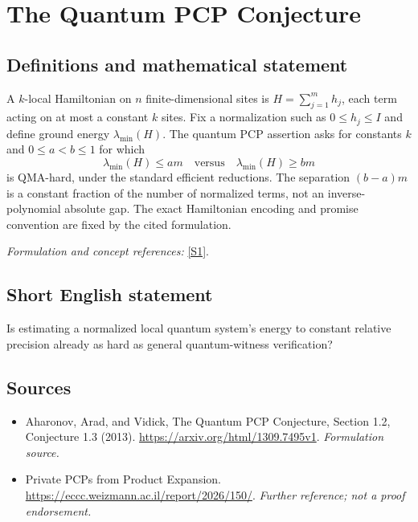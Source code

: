 \documentclass[11pt]{article}
\begin{document}
\section*{\texorpdfstring{The Quantum PCP Conjecture}{The Quantum PCP Conjecture}}\label{41}
\subsection{Definitions and mathematical statement}
A $k$-local Hamiltonian on $n$ finite-dimensional sites is $H=\sum_{j=1}^m h_j$, each term acting on at most a constant $k$ sites. Fix a normalization such as $0\le h_j\le I$ and define ground energy $\lambda_{\min}(H)$. The quantum PCP assertion asks for constants $k$ and $0\le a<b\le1$ for which
\[
 \lambda_{\min}(H)\le am\quad\text{versus}\quad\lambda_{\min}(H)\ge bm
\]
is QMA-hard, under the standard efficient reductions. The separation $(b-a)m$ is a constant fraction of the number of normalized terms, not an inverse-polynomial absolute gap. The exact Hamiltonian encoding and promise convention are fixed by the cited formulation.
\par\smallskip\textit{Formulation and concept references:} \href{https://arxiv.org/html/1309.7495v1}{[S1]}.

\subsection{Short English statement}
Is estimating a normalized local quantum system's energy to constant relative precision already as hard as general quantum-witness verification?
\subsection{Sources}
\begin{itemize}
\item[S1]Aharonov, Arad, and Vidick, The Quantum PCP Conjecture, Section 1.2, Conjecture 1.3 (2013).
\url{https://arxiv.org/html/1309.7495v1}.
\textit{Formulation source.}
\item[S2]Private PCPs from Product Expansion.
\url{https://eccc.weizmann.ac.il/report/2026/150/}.
\textit{Further reference; not a proof endorsement.}
\end{itemize}
\end{document}
